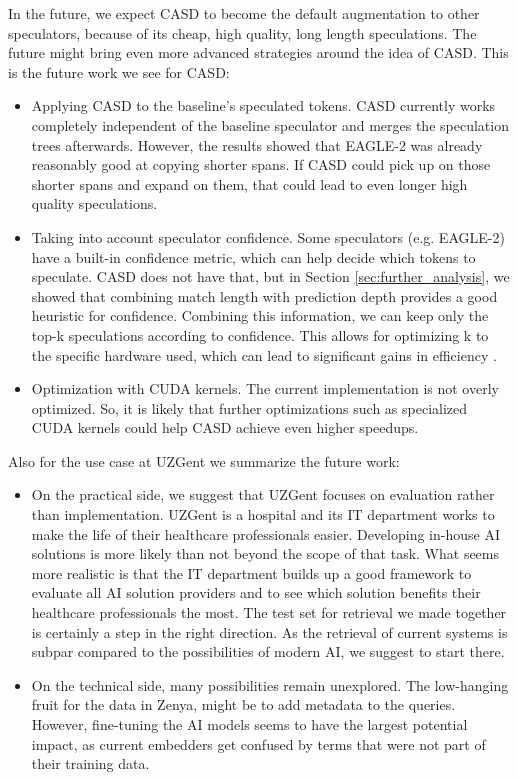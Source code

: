 In the future, we expect CASD to become the default augmentation to other speculators, because of its cheap, high quality, long length speculations. The future might bring even more advanced strategies around the idea of CASD. This is the future work we see for CASD:
\begin{itemize}
    \item Applying CASD to the baseline's speculated tokens. CASD currently works completely independent of the baseline speculator and merges the speculation trees afterwards. However, the results showed that EAGLE-2 was already reasonably good at copying shorter spans. If CASD could pick up on those shorter spans and expand on them, that could lead to even longer high quality speculations.
    \item Taking into account speculator confidence. Some speculators (e.g. EAGLE-2) have a built-in confidence metric, which can help decide which tokens to speculate. CASD does not have that, but in Section \ref{sec:further_analysis}, we showed that combining match length with prediction depth provides a good heuristic for confidence. Combining this information, we can keep only the top-k speculations according to confidence. This allows for optimizing k to the specific hardware used, which can lead to significant gains in efficiency \cite{fernandez2025energy}.
    \item Optimization with CUDA kernels. The current implementation is not overly optimized. So, it is likely that further optimizations such as specialized CUDA kernels could help CASD achieve even higher speedups.
\end{itemize}

Also for the use case at UZGent we summarize the future work:
\begin{itemize}
    \item On the practical side, we suggest that UZGent focuses on evaluation rather than implementation. UZGent is a hospital and its IT department works to make the life of their healthcare professionals easier. Developing in-house AI solutions is more likely than not beyond the scope of that task. What seems more realistic is that the IT department builds up a good framework to evaluate all AI solution providers and to see which solution benefits their healthcare professionals the most. The test set for retrieval we made together is certainly a step in the right direction. As the retrieval of current systems is subpar compared to the possibilities of modern AI, we suggest to start there.
    \item On the technical side, many possibilities remain unexplored. The low-hanging fruit for the data in Zenya, might be to add metadata to the queries. However, fine-tuning the AI models seems to have the largest potential impact, as current embedders get confused by terms that were not part of their training data.
\end{itemize}
